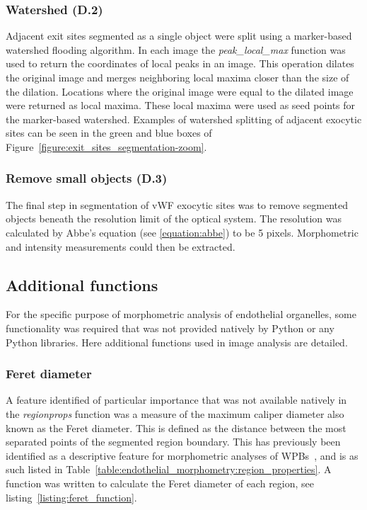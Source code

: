 \subsubsection{Watershed (D.2)}
Adjacent exit sites segmented as a single object were split using a marker-based watershed flooding algorithm. In each image the \emph{peak\_local\_max} function was used to return the coordinates of local peaks in an image. This operation dilates the original image and merges neighboring local maxima closer than the size of the dilation. Locations where the original image were equal to the dilated image were returned as local maxima. These local maxima were used as seed points for the marker-based watershed. Examples of watershed splitting of adjacent exocytic sites can be seen in the green and blue boxes of Figure~\ref{figure:exit_sites_segmentation-zoom}.

\subsubsection{Remove small objects (D.3)}
The final step in segmentation of vWF exocytic sites was to remove segmented objects beneath the resolution limit of the optical system. The resolution was calculated by Abbe's equation (see \ref{equation:abbe}) to be 5 pixels. Morphometric and intensity measurements could then be extracted.

\subsection{Additional functions}
\label{endothelial_morphometry:image_processing:additiona_functions}
For the specific purpose of morphometric analysis of endothelial organelles, some functionality was required that was not provided natively by Python or any Python libraries. Here additional functions used in image analysis are detailed.

\subsubsection{Feret diameter}
A feature identified of particular importance that was not available natively in the \emph{regionprops} function was a measure of the maximum caliper diameter also known as the Feret diameter. This is defined as the distance between the most separated points of the segmented region boundary. This has previously been identified as a descriptive feature for morphometric analyses of WPBs~\cite{Ferraro2014}, and is as such listed in Table~\ref{table:endothelial_morphometry:region_properties}. A function was written to calculate the Feret diameter of each region, see listing~\ref{listing:feret_function}. 

